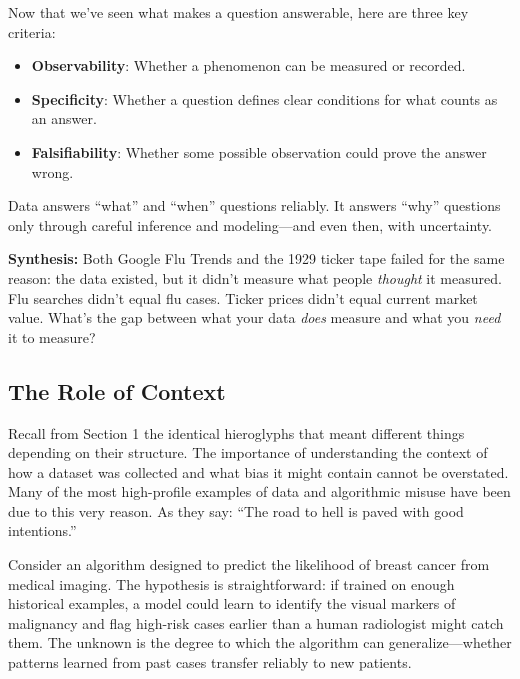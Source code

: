 \begin{keyterms}
Now that we've seen what makes a question answerable, here are three key criteria:
\begin{itemize}
    \item \textbf{Observability}: Whether a phenomenon can be measured or recorded.
    \item \textbf{Specificity}: Whether a question defines clear conditions for what counts as an answer.
    \item \textbf{Falsifiability}: Whether some possible observation could prove the answer wrong.
\end{itemize}
\end{keyterms}

\begin{keyinsight}
Data answers ``what'' and ``when'' questions reliably. It answers ``why'' questions only through careful inference and modeling---and even then, with uncertainty.
\end{keyinsight}

\begin{checkpoint}
\textbf{Synthesis:} Both Google Flu Trends and the 1929 ticker tape failed for the same reason: the data existed, but it didn't measure what people \textit{thought} it measured. Flu searches didn't equal flu cases. Ticker prices didn't equal current market value. What's the gap between what your data \textit{does} measure and what you \textit{need} it to measure?
\end{checkpoint}

\subsection{The Role of Context}

Recall from Section 1 the identical hieroglyphs that meant different things depending on their structure. 
The importance of understanding the context of how a dataset was collected and what bias it might contain cannot be overstated. 
Many of the most high-profile examples of data and algorithmic misuse have been due to this very reason.
As they say: ``The road to hell is paved with good intentions.''

Consider an algorithm designed to predict the likelihood of breast 
cancer from medical imaging. The hypothesis is straightforward: if 
trained on enough historical examples, a model could learn to identify 
the visual markers of malignancy and flag high-risk cases earlier than 
a human radiologist might catch them. The unknown is the degree to 
which the algorithm can generalize---whether patterns learned from 
past cases transfer reliably to new patients.

